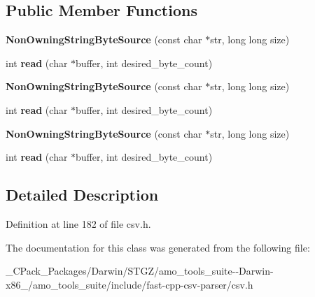 \subsection*{Public Member Functions}
\begin{DoxyCompactItemize}
\item 
\mbox{\label{classio_1_1detail_1_1_non_owning_string_byte_source_a8fd604017b38e20f90386b6e10bd95a3}} 
{\bfseries Non\+Owning\+String\+Byte\+Source} (const char $\ast$str, long long size)
\item 
\mbox{\label{classio_1_1detail_1_1_non_owning_string_byte_source_aba194be7e3a141f40d683db483a620bb}} 
int {\bfseries read} (char $\ast$buffer, int desired\+\_\+byte\+\_\+count)
\item 
\mbox{\label{classio_1_1detail_1_1_non_owning_string_byte_source_a8fd604017b38e20f90386b6e10bd95a3}} 
{\bfseries Non\+Owning\+String\+Byte\+Source} (const char $\ast$str, long long size)
\item 
\mbox{\label{classio_1_1detail_1_1_non_owning_string_byte_source_aba194be7e3a141f40d683db483a620bb}} 
int {\bfseries read} (char $\ast$buffer, int desired\+\_\+byte\+\_\+count)
\item 
\mbox{\label{classio_1_1detail_1_1_non_owning_string_byte_source_a8fd604017b38e20f90386b6e10bd95a3}} 
{\bfseries Non\+Owning\+String\+Byte\+Source} (const char $\ast$str, long long size)
\item 
\mbox{\label{classio_1_1detail_1_1_non_owning_string_byte_source_aba194be7e3a141f40d683db483a620bb}} 
int {\bfseries read} (char $\ast$buffer, int desired\+\_\+byte\+\_\+count)
\end{DoxyCompactItemize}


\subsection{Detailed Description}


Definition at line 182 of file csv.\+h.



The documentation for this class was generated from the following file\+:\begin{DoxyCompactItemize}
\item 
\+\_\+\+C\+Pack\+\_\+\+Packages/\+Darwin/\+S\+T\+G\+Z/amo\+\_\+tools\+\_\+suite-\/-\/\+Darwin-\/x86\+\_/amo\+\_\+tools\+\_\+suite/include/fast-\/cpp-\/csv-\/parser/csv.\+h\end{DoxyCompactItemize}
